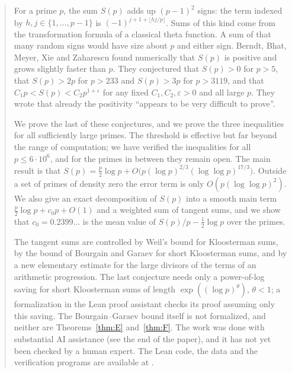\begin{abstract}
For a prime $p$, the sum $S(p)$ adds up $(p-1)^2$ signs: the term indexed by $h,j\in\{1,\dots,p-1\}$ is $(-1)^{j+1+\lfloor hj/p\rfloor}$. Sums of this kind come from the transformation formula of a classical theta function. A sum of that many random signs would have size about $p$ and either sign. Berndt, Bhat, Meyer, Xie and Zaharescu found numerically that $S(p)$ is positive and grows slightly faster than $p$. They conjectured that $S(p)>0$ for $p>5$, that $S(p)>2p$ for $p>233$ and $S(p)>3p$ for $p>3119$, and that $C_1p<S(p)<C_2p^{1+\varepsilon}$ for any fixed $C_1,C_2,\varepsilon>0$ and all large $p$. They wrote that already the positivity ``appears to be very difficult to prove''.

We prove the last of these conjectures, and we prove the three inequalities for all sufficiently large primes. The threshold is effective but far beyond the range of computation; we have verified the inequalities for all $p\le6\cdot10^6$, and for the primes in between they remain open. The main result is that $S(p)=\frac p2\log p+O\bigl(p(\log p)^{2/3}(\log\log p)^{17/3}\bigr)$. Outside a set of primes of density zero the error term is only $O(p(\log\log p)^2)$. We also give an exact decomposition of $S(p)$ into a smooth main term $\frac p2\log p+c_0p+O(1)$ and a weighted sum of tangent sums, and we show that $c_0=0.2399\ldots$ is the mean value of $S(p)/p-\frac12\log p$ over the primes.

The tangent sums are controlled by Weil's bound for Kloosterman sums, by the bound of Bourgain and Garaev for short Kloosterman sums, and by a new elementary estimate for the large divisors of the terms of an arithmetic progression. The last conjecture needs only a power-of-log saving for short Kloosterman sums of length $\exp((\log p)^\theta)$, $\theta<1$; a formalization in the Lean proof assistant checks its proof assuming only this saving. The Bourgain--Garaev bound itself is not formalized, and neither are Theorems~\ref{thm:E} and~\ref{thm:F}. The work was done with substantial AI assistance (see the end of the paper), and it has not yet been checked by a human expert. The Lean code, the data and the verification programs are available at \zenododoi.
\end{abstract}
